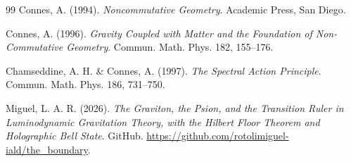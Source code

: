 \documentclass[12pt,a4paper,twoside]{article}
\begin{document}
\begin{thebibliography}{99}
Connes, A. (1994).
\textit{Noncommutative Geometry}.
Academic Press, San Diego.

Connes, A. (1996).
\textit{Gravity Coupled with Matter and the Foundation of Non-Commutative Geometry}.
Commun. Math. Phys. 182, 155--176.

Chamseddine, A. H. \& Connes, A. (1997).
\textit{The Spectral Action Principle}.
Commun. Math. Phys. 186, 731--750.

Miguel, L. A. R. (2026).
\textit{The Graviton, the Psion, and the Transition Ruler in Luminodynamic Gravitation Theory, with the Hilbert Floor Theorem and Holographic Bell State}.
GitHub. \url{https://github.com/rotolimiguel-iald/the_boundary}.

\end{thebibliography}
\end{document}
